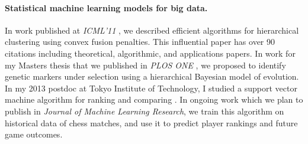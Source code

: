 \documentclass{article}
\begin{document}




\paragraph{Statistical machine learning models for big data.} In work
published at \emph{ICML'11} \citep{HOCKING-clusterpath}, we described
efficient algorithms for hierarchical clustering using convex fusion
penalties. This influential paper has over 90 citations including
theoretical, algorithmic, and applications papers. In work for my
Masters thesis that we published in \emph{PLOS ONE}
\citep{HOCKING-evolution}, we proposed to identify genetic markers
under selection using a hierarchical Bayesian model of evolution. In
my 2013 postdoc at Tokyo Institute of Technology, I studied a support
vector machine algorithm for ranking and comparing
\citep{svmcompare}. In ongoing work which we plan to publish in
\emph{Journal of Machine Learning Research}, we train this algorithm
on historical data of chess matches, and use it to predict player
rankings and future game outcomes.
\end{document}
